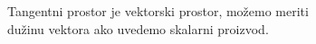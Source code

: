 \documentclass[preview]{standalone}
\begin{document}
\begin{center}
Tangentni prostor je vektorski prostor, možemo meriti\\
        dužinu vektora ako uvedemo skalarni proizvod.
\end{center}
\end{document}
